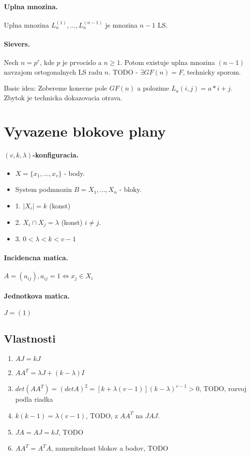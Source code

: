 \documentclass[10pt,a4paper]{article}
\begin{document}
\paragraph{Uplna mnozina.}
Uplna mnozina $L_n^{(1)}, \ldots ,L_n^{(n-1)}$ je mnozina $n-1$ LS.

\paragraph{Sievers.}
Nech $n=p^r$, kde $p$ je prvocislo a $n \geq 1$. Potom existuje uplna mnozina $(n-1)$ navzajom ortogonalnych LS radu $n$.
TODO - $\exists GF(n) = F$, technicky sporom. 

Basic idea: Zobereme konecne pole $GF(n)$ a polozime $L_a(i,j) = a*i+j$. Zbytok je technicka
dokazovacia otrava.

\section{Vyvazene blokove plany}
\paragraph{$(v,k,\lambda)$-konfiguracia.}
\begin{itemize}
\item $X = \{x_1, \ldots, x_v\}$ - body.
\item System podmnozin $B = {X_1, \ldots, X_n}$ - bloky. 
\item 1. $|X_i|=k$ (konst)
\item 2. $X_i \cap X_j = \lambda$ (konst) $i \neq j$.
\item 3. $0 < \lambda < k < v-1$
\end{itemize}
\paragraph{Incidencna matica.}
$A=(a_{ij}), a_{ij} = 1 \Leftrightarrow x_j \in X_i$
\paragraph{Jednotkova matica.}
$J=(1)$
\subsection{Vlastnosti}
\begin{enumerate}
\item $AJ = kJ$
\item $AA^T = \lambda J + (k-\lambda)I$
\item $det(AA^T)=(det A)^2=[k + \lambda(v-1)](k-\lambda)^{v-1} > 0$, TODO, rozvoj podla riadka
\item $k(k-1) = \lambda(v-1)$, TODO, z $AA^T$ na $JAJ$. 
\item $JA=AJ=kJ$, TODO
\item $AA^T=A^TA$, zamenitelnost blokov a bodov, TODO
\end{enumerate}
\end{document}
